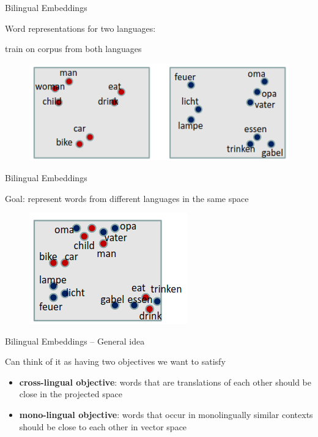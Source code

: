 \documentclass[12pt]{beamer}
\begin{document}
\begin{frame}{Bilingual Embeddings}
	
Word representations for two languages: 

train on corpus from both languages

\begin{figure}
	\includegraphics[width=0.6\linewidth]{img/biling-1.png}
\end{figure}
	
	
\end{frame}

\begin{frame}{Bilingual Embeddings}
	
Goal: represent words from different languages in the same space

	
	\begin{figure}
		\includegraphics[width=0.4\linewidth]{img/biling-2.png}
	\end{figure}
	
	
\end{frame}

\begin{frame}{Bilingual Embeddings -- General idea}
	
Can think of it as having two objectives we want to satisfy
	
\begin{itemize}
	\item \textbf{cross-lingual objective}: words that are translations of each other should be close in the projected space
	\item \textbf{mono-lingual objective}: words that occur in monolingually similar contexts should be close to each other in vector space
\end{itemize}	
	
	
\end{frame}
\end{document}
